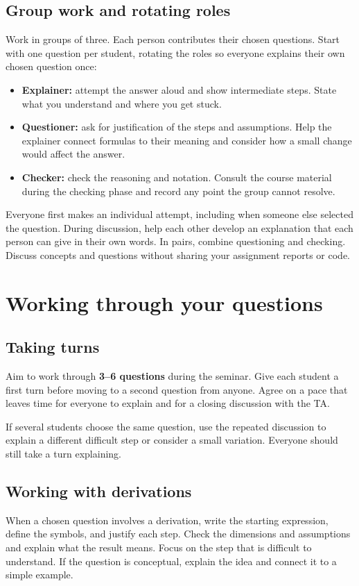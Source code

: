 \documentclass[11pt,a4paper]{article}
\begin{document}
\subsection*{Group work and rotating roles}
Work in groups of three. Each person contributes their chosen questions. Start with one question per student, rotating the roles so everyone explains their own chosen question once:
\begin{itemize}
\item \textbf{Explainer:} attempt the answer aloud and show intermediate steps. State what you understand and where you get stuck.
\item \textbf{Questioner:} ask for justification of the steps and assumptions. Help the explainer connect formulas to their meaning and consider how a small change would affect the answer.
\item \textbf{Checker:} check the reasoning and notation. Consult the course material during the checking phase and record any point the group cannot resolve.
\end{itemize}
Everyone first makes an individual attempt, including when someone else selected the question. During discussion, help each other develop an explanation that each person can give in their own words. In pairs, combine questioning and checking. Discuss concepts and questions without sharing your assignment reports or code.

\newpage
\section*{Working through your questions}

\subsection*{Taking turns}
Aim to work through \textbf{3--6 questions} during the seminar. Give each student a first turn before moving to a second question from anyone. Agree on a pace that leaves time for everyone to explain and for a closing discussion with the TA.

If several students choose the same question, use the repeated discussion to explain a different difficult step or consider a small variation. Everyone should still take a turn explaining.

\subsection*{Working with derivations}
When a chosen question involves a derivation, write the starting expression, define the symbols, and justify each step. Check the dimensions and assumptions and explain what the result means. Focus on the step that is difficult to understand. If the question is conceptual, explain the idea and connect it to a simple example.
\end{document}
